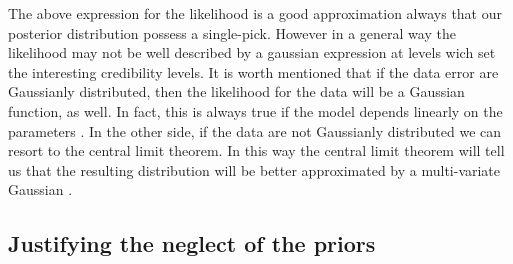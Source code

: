 \documentclass[onecolumn,           %
               showpacs,            %
               preprintnumbers,     %
               aps,                 %
               prl,          	    %
               letterpaper,             %
               superscriptaddress,      %
               nofootinbib,         %
               tightenlines,        %
               floats,floatfix      %
               ,usenatbib,
               ]{revtex4-1}
\begin{document}
The above expression for the likelihood is a good approximation always that our posterior distribution possess a single-pick. However in a general way the likelihood may not be well described by a gaussian expression at levels wich set the interesting credibility levels. It is worth mentioned that if the data error are Gaussianly distributed, then the likelihood for the data will be a Gaussian function, as well.  In fact, this is always true if the model depends linearly on the parameters \cite{LiV}. In the other side, if the data are not Gaussianly distributed we can resort to the central limit theorem. In this way the central limit theorem will tell us that the resulting distribution will be better approximated by a multi-variate Gaussian \cite{LiV}.
\subsection{Justifying the neglect of the priors}
\end{document}

